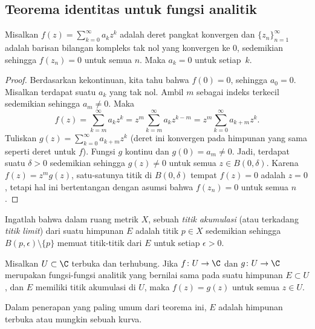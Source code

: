 \subsection{Teorema identitas untuk fungsi analitik}

\begin{lemma}
Misalkan $f(z) = \sum_{k=0}^\infty a_k z^k$ adalah deret pangkat konvergen dan
$\{ z_n \}_{n=1}^\infty$ adalah barisan bilangan kompleks tak nol yang konvergen ke 0,
sedemikian sehingga $f(z_n) = 0$ untuk semua $n$.  Maka $a_k = 0$ untuk setiap~$k$.
\end{lemma}

\begin{proof}
Berdasarkan kekontinuan, kita tahu bahwa $f(0) = 0$, sehingga $a_0 = 0$.
Misalkan terdapat suatu $a_k$ yang tak nol.
Ambil $m$ sebagai indeks terkecil sedemikian sehingga $a_m \neq 0$.  Maka
\begin{equation*}
f(z) = \sum_{k=m}^\infty a_k z^k = 
z^m \sum_{k=m}^\infty a_k z^{k-m} =
z^m \sum_{k=0}^\infty a_{k+m} z^{k} .
\end{equation*}
Tuliskan $g(z) = \sum_{k=0}^\infty a_{k+m} z^{k}$ (deret ini konvergen
pada himpunan yang sama seperti deret untuk $f$).  Fungsi $g$ kontinu dan
$g(0) = a_m \neq 0$.  Jadi, terdapat suatu $\delta > 0$ sedemikian sehingga
$g(z) \neq 0$ untuk semua $z \in B(0,\delta)$.  Karena $f(z) = z^m g(z)$,
satu-satunya titik di $B(0,\delta)$ tempat $f(z) = 0$ adalah $z=0$, tetapi hal
ini bertentangan dengan asumsi bahwa $f(z_n) = 0$ untuk semua $n$.
\end{proof}

Ingatlah bahwa dalam ruang metrik $X$, sebuah \emph{titik akumulasi}
(atau terkadang \emph{titik limit}) dari suatu himpunan
$E$ adalah titik $p \in X$ sedemikian sehingga
$B(p,\epsilon) \setminus \{ p \}$ memuat titik-titik dari $E$
untuk setiap $\epsilon > 0$.

\begin{thm}
\label{thm:identityanalytic}%
%
Misalkan $U \subset \C$ terbuka dan terhubung.  Jika $f \colon U \to \C$
dan $g \colon U \to \C$ merupakan fungsi-fungsi analitik yang bernilai
sama pada suatu himpunan $E \subset U$, dan $E$ memiliki titik akumulasi
di $U$, maka $f(z) = g(z)$ untuk semua $z \in U$.
\end{thm}

Dalam penerapan yang paling umum dari teorema ini, $E$ adalah himpunan terbuka
atau mungkin sebuah kurva.

